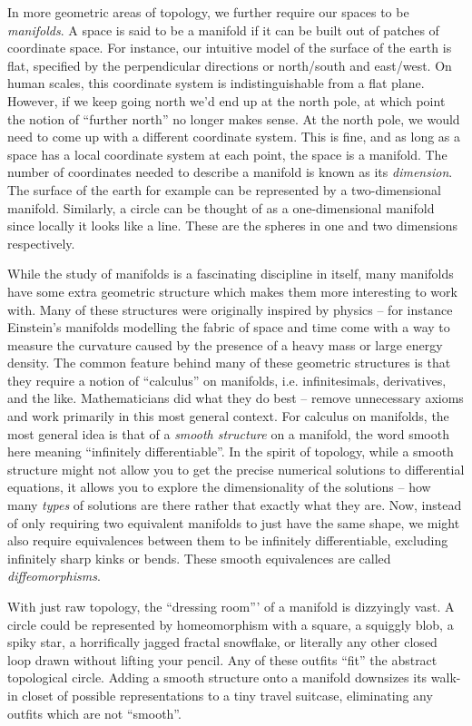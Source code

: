 In more geometric areas of topology, we further require our spaces to be \emph{manifolds}.
A space is said to be a manifold if it can be built out of patches of coordinate space. For instance, our intuitive model of the surface of the earth is flat, specified by the perpendicular directions or north/south and east/west. On human scales, this coordinate system is indistinguishable from a flat plane. However, if we keep going north we'd end up at the north pole, at which point the notion of ``further north'' no longer makes sense. At the north pole, we would need to come up with a different coordinate system. This is fine, and as long as a space has a local coordinate system at each point, the space is a manifold. The number of coordinates needed to describe a manifold is known as its \emph{dimension}. The surface of the earth for example can be represented by a two-dimensional manifold. Similarly, a circle can be thought of as a one-dimensional manifold since locally it looks like a line. These are the spheres in one and two dimensions respectively.

While the study of manifolds is a fascinating discipline in itself, many manifolds have some extra geometric structure which makes them more interesting to work with. Many of these structures were originally inspired by physics -- for instance Einstein's manifolds modelling the fabric of space and time come with a way to measure the curvature caused by the presence of a heavy mass or large energy density.
The common feature behind many of these geometric structures is that they require a notion of ``calculus'' on manifolds, i.e. infinitesimals, derivatives, and the like. Mathematicians did what they do best -- remove unnecessary axioms and work primarily in this most general context. For calculus on manifolds, the most general idea is that of a \emph{smooth structure} on a manifold, the word smooth here meaning ``infinitely differentiable''. In the spirit of topology, while a smooth structure might not allow you to get the precise numerical solutions to differential equations, it allows you to explore the dimensionality of the solutions -- how many \emph{types} of solutions are there rather that exactly what they are. Now, instead of only requiring two equivalent manifolds to just have the same shape, we might also require equivalences between them to be infinitely differentiable, excluding infinitely sharp kinks or bends. These smooth equivalences are called \emph{diffeomorphisms}.

With just raw topology, the ``dressing room''' of a manifold is dizzyingly vast.
A circle could be represented by homeomorphism with a square, a squiggly blob, a spiky star, a horrifically jagged fractal snowflake, or literally any other closed loop drawn without lifting your pencil. Any of these outfits ``fit'' the abstract topological circle.
Adding a smooth structure onto a manifold downsizes its walk-in closet of possible representations to a tiny travel suitcase, eliminating any outfits which are not ``smooth''.


